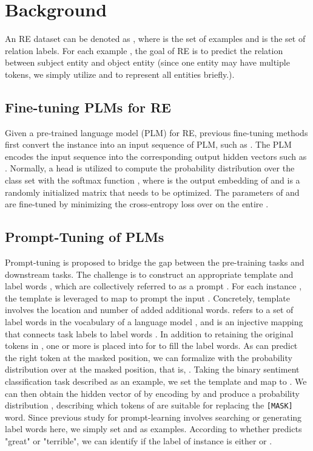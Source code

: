 \documentclass[sigconf]{acmart}
\begin{document}
\section{Background}
\label{sec:setup}
An RE dataset can be denoted as , where  is the set of examples and  is the set of relation labels. 
For each example , the goal of RE is to predict the relation  between subject entity  and object entity  (since one entity may have multiple tokens, we simply utilize  and  to represent all entities briefly.).


\subsection{Fine-tuning PLMs for RE} 

Given a pre-trained language model (PLM)  for RE, previous fine-tuning methods first convert the instance  into an input sequence of PLM, such as . 
The PLM  encodes the input sequence into the corresponding output hidden vectors such as . 
Normally, a  head is utilized to compute the probability distribution over the class set  with the softmax function , where  is the output embedding of  and  is a randomly initialized matrix that needs to be optimized. 
The parameters of  and  are fine-tuned by minimizing the cross-entropy loss over  on the entire .

\subsection{Prompt-Tuning of PLMs}
Prompt-tuning is proposed to bridge the gap between the pre-training tasks and downstream tasks.
The challenge is to construct an appropriate template  and label words , which are collectively referred to as a prompt . 
For each instance , the template is leveraged to map  to prompt the input . 
Concretely, template  involves the location and number of added additional words.
 refers to a set of label words in the vocabulary of a language model , and  is an injective mapping that connects task labels to label words . 
In addition to retaining the original tokens in , one or more  is placed into  for  to fill the label words. 
As  can predict the right token at the masked position, we can formalize  with the probability distribution over  at the masked position, that is, .
Taking the binary sentiment classification task described as an example, we set the template  and map  to . 
We can then obtain the hidden vector of  by encoding   by  and produce a probability distribution , describing which tokens of  are suitable for replacing the \texttt{[MASK]} word. 
Since previous study for prompt-learning involves searching or generating label words
here, we simply set   and  as examples. According to whether  predicts "great" or "terrible", we can identify if the label of instance  is either  or .
\end{document}
